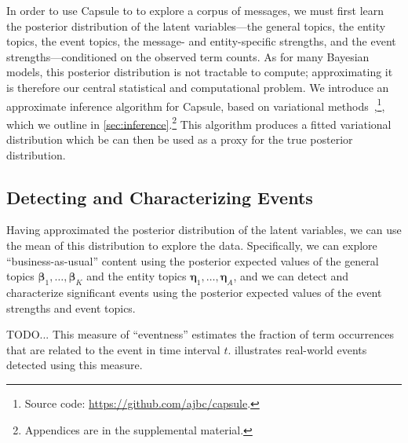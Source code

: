 In order to use Capsule to to explore a corpus of messages, we must
first learn the posterior distribution of the latent variables---the
general topics, the entity topics, the event topics, the message- and
entity-specific strengths, and the event strengths---conditioned on
the observed term counts. As for many Bayesian models, this posterior
distribution is not tractable to compute; approximating it is
therefore our central statistical and computational problem. We
introduce an approximate inference algorithm for Capsule, based on
variational methods~\cite{Jordan:1999},\footnote{Source code:
  \url{https://github.com/ajbc/capsule}.}, which we outline in
\cref{sec:inference}.\footnote{Appendices are in the supplemental
  material.} This algorithm produces a fitted variational distribution
which be can then be used as a proxy for the true posterior
distribution.

\subsection{Detecting and Characterizing Events}
\label{sec:detecting}

Having approximated the posterior distribution of the latent
variables, we can use the mean of this distribution to explore the
data. Specifically, we can explore ``business-as-usual'' content using
the posterior expected values of the general topics
$\mathbold{\beta}_1, \ldots, \mathbold{\beta}_K$ and the entity topics
$\mathbold{\eta}_1, \ldots, \mathbold{\eta}_A$, and we can detect and
characterize significant events using the posterior expected values of
the event strengths and event topics.

TODO... This measure of ``eventness'' estimates the fraction of term
occurrences that are related to the event in time interval
$t$.  illustrates real-world events detected
using this measure.

